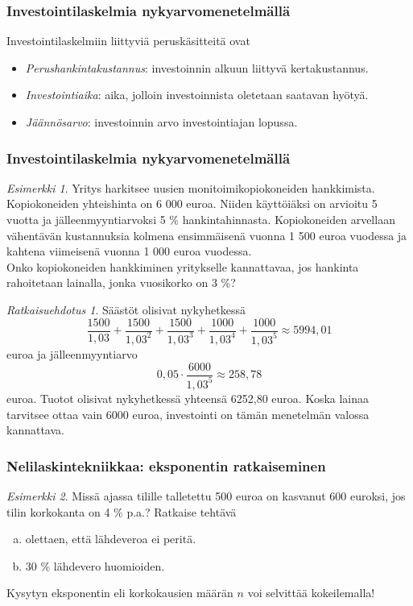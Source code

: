 \documentclass[handout]{beamer}\usepackage[]{graphicx}\usepackage[]{color}
\theoremstyle{remark}
\newtheorem{esim}{Esimerkki}
\newtheorem{ratkaisu}{Ratkaisuehdotus}
\newcommand{\pblock}{\\ \vspace{0.5cm}\pause}
\begin{document}
\begin{frame}
    \frametitle{Investointilaskelmia nykyarvomenetelmällä}
    Investointilaskelmiin liittyviä peruskäsitteitä ovat \pause
    \begin{itemize}
        \item \emph{Perushankintakustannus}: investoinnin alkuun liittyvä kertakustannus. \pause
        \item \emph{Investointiaika}: aika, jolloin investoinnista oletetaan saatavan hyötyä. \pause
        \item \emph{Jäännösarvo}: investoinnin arvo investointiajan lopussa.
    \end{itemize}
\end{frame}

\begin{frame}
\frametitle{Investointilaskelmia nykyarvomenetelmällä}
    \begin{esim}
    Yritys harkitsee uusien monitoimikopiokoneiden hankkimista.
    Kopiokoneiden yhteishinta on 6 000 euroa. Niiden käyttöiäksi on arvioitu 5 vuotta ja jälleenmyyntiarvoksi 5 \% hankintahinnasta.
    Kopiokoneiden arvellaan vähentävän kustannuksia kolmena ensimmäisenä vuonna 1 500 euroa vuodessa ja kahtena viimeisenä vuonna 1 000 euroa vuodessa.
    \pblock
    Onko kopiokoneiden hankkiminen yritykselle kannattavaa, jos hankinta rahoitetaan lainalla, jonka vuosikorko on 3 \%?
    \end{esim}
\end{frame}

\begin{frame}
    \begin{ratkaisu}
        Säästöt olisivat nykyhetkessä
        \[
            \frac{1500}{1,03} + \frac{1500}{1,03^2} + \frac{1500}{1,03^3} + \frac{1000}{1,03^4} + \frac{1000}{1,03^5}\approx 5994,01
       \]
       euroa ja jälleenmyyntiarvo
       \[
            0,05\cdot\frac{6000}{1,03^5}\approx 258,78
       \]
       euroa. Tuotot olisivat nykyhetkessä yhteensä 6252,80 euroa. Koska lainaa tarvitsee ottaa vain 6000 euroa,
       investointi on tämän menetelmän valossa kannattava.
    \end{ratkaisu}
\end{frame}

\begin{frame}
    \frametitle{Nelilaskintekniikkaa: eksponentin ratkaiseminen}
    \pause
    \begin{esim}
        Missä ajassa tilille talletettu 500 euroa on kasvanut 600 euroksi, jos tilin korkokanta on 4 \% p.a.?
        Ratkaise tehtävä
        \begin{enumerate}[(a)]
            \item olettaen, että lähdeveroa ei peritä.
            \item 30 \% lähdevero huomioiden.
        \end{enumerate}
    \end{esim}
    \pause
    Kysytyn eksponentin  eli korkokausien määrän $n$ voi selvittää kokeilemalla!
\end{frame}
\end{document}
